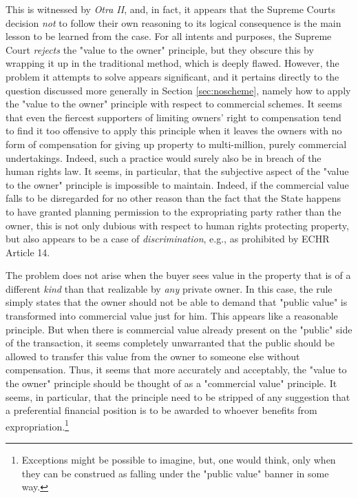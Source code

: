 This is witnessed by \emph{Otra II}, and, in fact, it appears that the Supreme Courts decision \emph{not} to follow their own reasoning to its logical consequence is the main lesson to be learned from the case. For all intents and purposes, the Supreme Court \emph{rejects} the "value to the owner" principle, but they obscure this by wrapping it up in the traditional method, which is deeply flawed. However, the problem it attempts to solve appears significant, and it pertains directly to the question discussed more generally in Section \ref{sec:noscheme}, namely how to apply the "value to the owner" principle with respect to commercial schemes. It seems that even the fiercest supporters of limiting owners' right to compensation tend to find it too offensive to apply this principle when it leaves the owners with no form of compensation for giving up property to multi-million, purely commercial undertakings. Indeed, such a practice would surely also be in breach of the human rights law. It seems, in particular, that the subjective aspect of the "value to the owner" principle is impossible to maintain. Indeed, if the commercial value falls to be disregarded for no other reason than the fact that the State happens to have granted planning permission to the expropriating party rather than the owner, this is not only dubious with respect to human rights protecting property, but also appears to be a case of \emph{discrimination}, e.g., as prohibited by ECHR Article 14.

The problem does not arise when the buyer sees value in the property that is of a different \emph{kind} than that realizable by \emph{any} private owner. In this case, the rule simply states that the owner should not be able to demand that "public value" is transformed into commercial value just for him. This appears like a reasonable principle. But when there is commercial value already present on the "public" side of the transaction, it seems completely unwarranted that the public should be allowed to transfer this value from the owner to someone else without compensation. Thus, it seems that more accurately and acceptably, the "value to the owner" principle should be thought of as a "commercial value" principle. It seems, in particular, that the principle need to be stripped of any suggestion that a preferential financial position is to be awarded to whoever benefits from expropriation.\footnote{Exceptions might be possible to imagine, but, one would think, only when they can be construed as falling under the "public value" banner in some way.}

